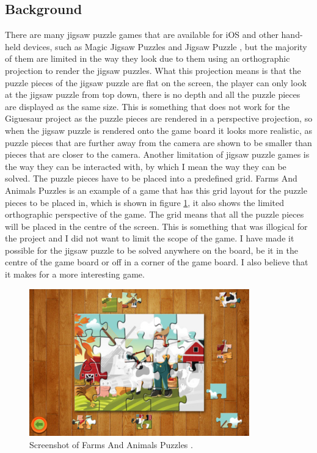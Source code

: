 \documentclass{article}
\begin{document}
\subsection{Background}
There are many jigsaw puzzle games that are available for iOS and other
hand-held devices, such as Magic Jigsaw Puzzles \cite{ref:MagicJigsaw} and
Jigsaw Puzzle \cite{ref:JigsawPuzzle}, but the majority of them are limited in
the way they look due to them using an orthographic projection to render the
jigsaw puzzles. What this projection means is that the puzzle pieces of the
jigsaw puzzle are flat on the screen, the player can only look at the jigsaw
puzzle from top down, there is no depth and all the puzzle pieces are displayed
as the same size. This is something that does not work for the Giguesaur project
as the puzzle pieces are rendered in a perspective projection, so when the
jigsaw puzzle is rendered onto the game board it looks more realistic, as puzzle
pieces that are further away from the camera are shown to be smaller than pieces
that are closer to the camera. Another limitation of jigsaw puzzle games is the
way they can be interacted with, by which I mean the way they can be solved. The
puzzle pieces have to be placed into a predefined grid. Farms And Animals
Puzzles \cite{ref:FarmPuzzle} is an example of a game that has this grid layout
for the puzzle pieces to be placed in, which is shown in figure
\ref{fig:FarmsAnimals}, it also shows the limited orthographic perspective of
the game. The grid means that all the puzzle pieces will be placed in the centre
of the screen. This is something that was illogical for the project and I did
not want to limit the scope of the game. I have made it possible for the jigsaw
puzzle to be solved anywhere on the board, be it in the centre of the game board
or off in a corner of the game board. I also believe that it makes for a more
interesting game.

\begin{figure}[ht]
\begin{center}
\includegraphics[width=0.85\textwidth]{images/FarmAnimalsJigsawImage}
\caption{Screenshot of Farms And Animals Puzzles \cite{img:FarmPuzzle}.}
\label{fig:FarmsAnimals}
\end{center}
\end{figure}
\end{document}
